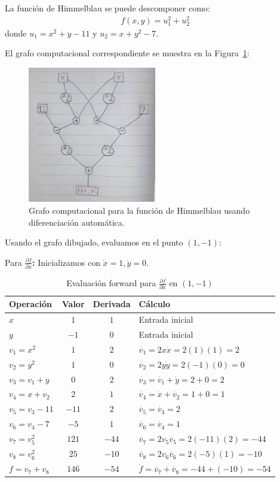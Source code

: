 \documentclass{article}
\begin{document}
La función de Himmelblau se puede descomponer como:
\begin{align}
f(x,y) = u_1^2 + u_2^2
\end{align}
donde $u_1 = x^2 + y - 11$ y $u_2 = x + y^2 - 7$.

El grafo computacional correspondiente se muestra en la Figura~\ref{fig:grafo_himmelblau}:

\begin{figure}[H]
\centering
\includegraphics[width=0.5\textwidth]{images/10_autodiff.jpg}
\caption{Grafo computacional para la función de Himmelblau usando diferenciación automática.}
\label{fig:grafo_himmelblau}
\end{figure}

Usando el grafo dibujado, evaluamos en el punto $(1,-1)$:

Para\textbf{ $\frac{\partial f}{\partial x}$:}
Inicializamos con $\dot{x} = 1, \dot{y} = 0$.

\begin{table}[h]
\centering
\begin{tabular}{|l|c|c|l|}
\hline
\textbf{Operación} & \textbf{Valor} & \textbf{Derivada} & \textbf{Cálculo} \\
\hline
$x$ & $1$ & $1$ & Entrada inicial \\
$y$ & $-1$ & $0$ & Entrada inicial \\
\hline
$v_1 = x^2$ & $1$ & $2$ & $\dot{v_1} = 2x\dot{x} = 2(1)(1) = 2$ \\
$v_2 = y^2$ & $1$ & $0$ & $\dot{v_2} = 2y\dot{y} = 2(-1)(0) = 0$ \\
\hline
$v_3 = v_1 + y$ & $0$ & $2$ & $\dot{v_3} = \dot{v_1} + \dot{y} = 2 + 0 = 2$ \\
$v_4 = x + v_2$ & $2$ & $1$ & $\dot{v_4} = \dot{x} + \dot{v_2} = 1 + 0 = 1$ \\
\hline
$v_5 = v_3 - 11$ & $-11$ & $2$ & $\dot{v_5} = \dot{v_3} = 2$ \\
$v_6 = v_4 - 7$ & $-5$ & $1$ & $\dot{v_6} = \dot{v_4} = 1$ \\
\hline
$v_7 = v_5^2$ & $121$ & $-44$ & $\dot{v_7} = 2v_5\dot{v_5} = 2(-11)(2) = -44$ \\
$v_8 = v_6^2$ & $25$ & $-10$ & $\dot{v_8} = 2v_6\dot{v_6} = 2(-5)(1) = -10$ \\
\hline
$f = v_7 + v_8$ & $146$ & $-54$ & $\dot{f} = \dot{v_7} + \dot{v_8} = -44 + (-10) = -54$ \\
\hline
\end{tabular}
\caption{Evaluación forward para $\frac{\partial f}{\partial x}$ en $(1,-1)$}
\end{table}
\end{document}
